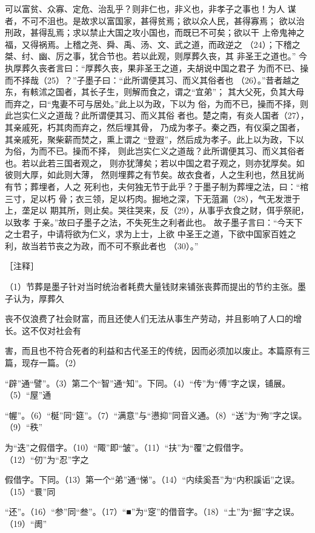 \documentclass[12pt,UTF8]{ctexbook}
\begin{document}
可以富贫、众寡、定危、治乱乎？则非仁也，非义也，非孝子之事也！为人 
谋者，不可不沮也。是故求以富国家，甚得贫焉；欲以众人民，甚得寡焉； 
欲以治刑政，甚得乱焉；求以禁止大国之攻小国也，而既已不可矣；欲以干 
上帝鬼神之福，又得祸焉。上稽之尧、舜、禹、汤、文、武之道，而政逆之 
（24）；下稽之桀、纣、幽、厉之事，犹合节也。若以此观，则厚葬久丧，其 
非圣王之道也。” 
今执厚葬久丧者言曰：“厚葬久丧，果非圣王之道，夫胡说中国之君子 
为而不已、操而不择哉（25）？”子墨子曰：“此所谓便其习、而义其俗者也 
（26）。”昔者越之东，有輆沭之国者，其长子生，则解而食之，谓之“宜弟”； 
其大父死，负其大母而弃之，曰“鬼妻不可与居处。”此上以为政，下以为 
俗，为而不已，操而不择，则此岂实仁义之道哉？此所谓便其习、而义其俗 
者也。楚之南，有炎人国者（27），其亲戚死，朽其肉而弃之，然后埋其骨， 
乃成为孝子。秦之西，有仪渠之国者，其亲戚死，聚柴薪而焚之，熏上谓之 
“登遐”，然后成为孝子。此上以为政，下以为俗，为而不已。操而不择， 
则此岂实仁义之道哉？此所谓便其习、而义其俗者也。若以此若三国者观之， 
则亦犹薄矣；若以中国之君子观之，则亦犹厚矣。如彼则大厚，如此则大薄， 
然则埋葬之有节矣。故衣食者，人之生利也，然且犹尚有节；葬埋者，人之 
死利也，夫何独无节于此乎？于墨子制为葬埋之法，曰：“棺三寸，足以朽 
骨；衣三领，足以朽肉。掘地之深，下无菹漏（28），气无发泄于上，垄足以 
期其所，则止矣。哭往哭来，反（29），从事乎衣食之财，佴乎祭祀，以致孝 
于亲。”故曰子墨子之法，不失死生之利者此也。 
故子墨子言曰：“今天下之士君子，中请将欲为仁义，求为上士，上欲 
中圣王之道，下欲中国家百姓之利，故当若节丧之为政，而不可不察此者也 
（30）。” 


［注释］ 

（1）节葬是墨子针对当时统治者耗费大量钱财来铺张丧葬而提出的节约主张。墨子认为，厚葬久 

丧不仅浪费了社会财富，而且还使人们无法从事生产劳动，并且影响了人口的增长。这不仅对社会有 

害，而且也不符合死者的利益和古代圣王的传统，因而必须加以废止。本篇原有三篇，现存一篇。（2） 

“辟”通“譬”。（3）第二个“智”通“知”。下同。（4）“传”为“傅”字之误，铺展。（5）“屋”通 

“幄”。（6）“梴”同“筵”。（7）“满意”与“懑抑”同音义通。（8）“送”为“殉”字之误。（9）“秩” 

为“迭”之假借字。（10）“陬”即“皱”。（11）“扶”为“覆”之假借字。（12）“仞”为“忍”字之 

假借字。下同。（13）第一个“弟”通“悌”。（14）“内续奚吾”为“内积謑诟”之误。（15）“睘”同 

“还”。（16）“参”同“叁”。（17）“■”为“窆”的借音字。（18）“土”为“掘”字之误。（19）“阓” 
\end{document}
